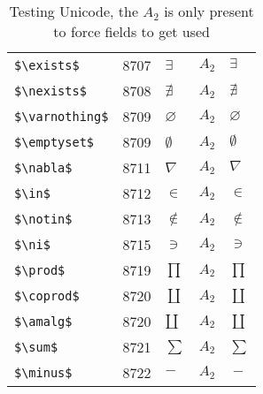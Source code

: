 \documentclass{article}
\begin{document}
\begin{table}
\begin{center}
\begin{tabular}{llll}
 \verb#$\exists$#              & 8707    & $\exists$              & $A_2\quad \exists$\\
 \verb#$\nexists$#             & 8708    & $\nexists$             & $A_2\quad \nexists$\\
 \verb#$\varnothing$#          & 8709    & $\varnothing$          & $A_2\quad \varnothing$\\
 \verb#$\emptyset$#            & 8709    & $\emptyset$            & $A_2\quad \emptyset$\\
 \verb#$\nabla$#               & 8711    & $\nabla$               & $A_2\quad \nabla$\\
 \verb#$\in$#                  & 8712    & $\in$                  & $A_2\quad \in$\\
 \verb#$\notin$#               & 8713    & $\notin$               & $A_2\quad \notin$\\
 \verb#$\ni$#                  & 8715    & $\ni$                  & $A_2\quad \ni$\\
 \verb#$\prod$#                & 8719    & $\prod$                & $A_2\quad \prod$\\
 \verb#$\coprod$#              & 8720    & $\coprod$              & $A_2\quad \coprod$\\
 \verb#$\amalg$#               & 8720    & $\amalg$               & $A_2\quad \amalg$\\
 \verb#$\sum$#                 & 8721    & $\sum$                 & $A_2\quad \sum$\\
 \verb#$\minus$#               & 8722    & $\minus$               & $A_2\quad \minus$\\
\end{tabular}
\end{center}
\caption{Testing Unicode, the $A_2$ is only present to force fields to get used}
\end{table}
\clearpage
\end{document}
